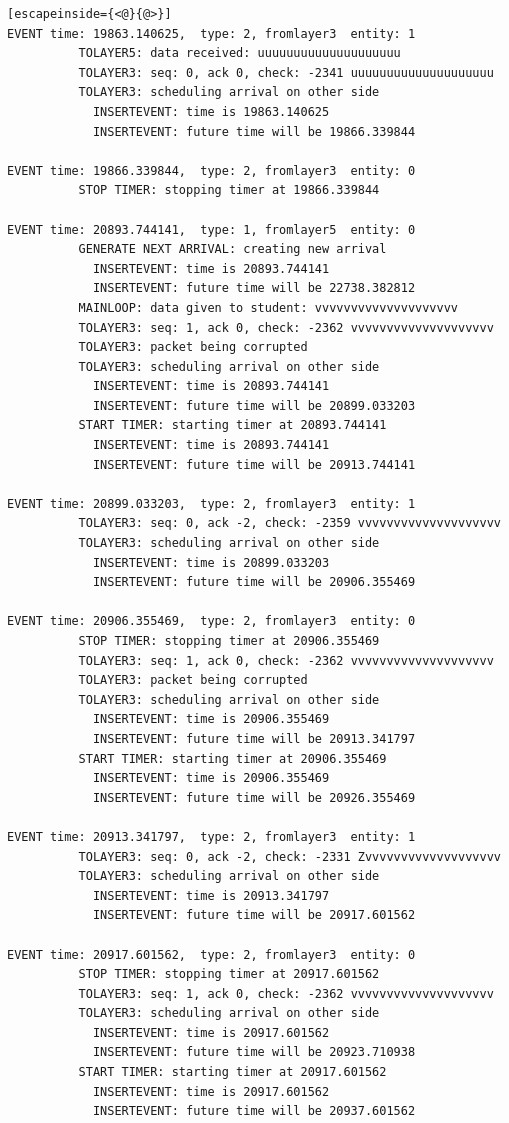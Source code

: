 \documentclass[paper=a4, fontsize=11pt]{scrartcl}
\numberwithin{equation}{section}		%
\numberwithin{figure}{section}			%
\numberwithin{table}{section}				%
\begin{document}
\begin{lstlisting}[escapeinside={<@}{@>}]
EVENT time: 19863.140625,  type: 2, fromlayer3  entity: 1
          TOLAYER5: data received: uuuuuuuuuuuuuuuuuuuu
          TOLAYER3: seq: 0, ack 0, check: -2341 uuuuuuuuuuuuuuuuuuuu
          TOLAYER3: scheduling arrival on other side
            INSERTEVENT: time is 19863.140625
            INSERTEVENT: future time will be 19866.339844

EVENT time: 19866.339844,  type: 2, fromlayer3  entity: 0
          STOP TIMER: stopping timer at 19866.339844

EVENT time: 20893.744141,  type: 1, fromlayer5  entity: 0
          GENERATE NEXT ARRIVAL: creating new arrival
            INSERTEVENT: time is 20893.744141
            INSERTEVENT: future time will be 22738.382812
          MAINLOOP: data given to student: vvvvvvvvvvvvvvvvvvvv
          TOLAYER3: seq: 1, ack 0, check: -2362 vvvvvvvvvvvvvvvvvvvv
          TOLAYER3: packet being corrupted
          TOLAYER3: scheduling arrival on other side
            INSERTEVENT: time is 20893.744141
            INSERTEVENT: future time will be 20899.033203
          START TIMER: starting timer at 20893.744141
            INSERTEVENT: time is 20893.744141
            INSERTEVENT: future time will be 20913.744141

EVENT time: 20899.033203,  type: 2, fromlayer3  entity: 1
          TOLAYER3: seq: 0, ack -2, check: -2359 vvvvvvvvvvvvvvvvvvvv
          TOLAYER3: scheduling arrival on other side
            INSERTEVENT: time is 20899.033203
            INSERTEVENT: future time will be 20906.355469

EVENT time: 20906.355469,  type: 2, fromlayer3  entity: 0
          STOP TIMER: stopping timer at 20906.355469
          TOLAYER3: seq: 1, ack 0, check: -2362 vvvvvvvvvvvvvvvvvvvv
          TOLAYER3: packet being corrupted
          TOLAYER3: scheduling arrival on other side
            INSERTEVENT: time is 20906.355469
            INSERTEVENT: future time will be 20913.341797
          START TIMER: starting timer at 20906.355469
            INSERTEVENT: time is 20906.355469
            INSERTEVENT: future time will be 20926.355469

EVENT time: 20913.341797,  type: 2, fromlayer3  entity: 1
          TOLAYER3: seq: 0, ack -2, check: -2331 Zvvvvvvvvvvvvvvvvvvv
          TOLAYER3: scheduling arrival on other side
            INSERTEVENT: time is 20913.341797
            INSERTEVENT: future time will be 20917.601562

EVENT time: 20917.601562,  type: 2, fromlayer3  entity: 0
          STOP TIMER: stopping timer at 20917.601562
          TOLAYER3: seq: 1, ack 0, check: -2362 vvvvvvvvvvvvvvvvvvvv
          TOLAYER3: scheduling arrival on other side
            INSERTEVENT: time is 20917.601562
            INSERTEVENT: future time will be 20923.710938
          START TIMER: starting timer at 20917.601562
            INSERTEVENT: time is 20917.601562
            INSERTEVENT: future time will be 20937.601562


\end{lstlisting}
\end{document}
